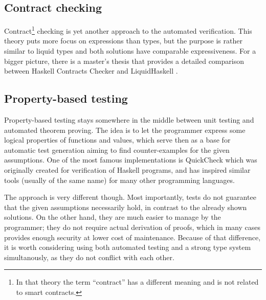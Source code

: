 \subsection{Contract checking}

Contract\footnote{In that theory the term ``contract'' has a different meaning
  and is not related to smart contracts.} checking \cite{Bruce_contractsfor} is
yet another approach to the automated verification. This theory puts more focus
on expressions than types, but the purpose is rather similar to liquid types and
both solutions have comparable expressiveness. For a bigger picture, there is a
master's thesis \cite{wojciechbaranowski2014} that provides a detailed
comparison between Haskell Contracts Checker \cite{10.1145/2480359.2429121} and
LiquidHaskell \cite{vazou2014refinement}.

\subsection{Property-based testing}

Property-based testing stays somewhere in the middle between unit testing and
automated theorem proving. The idea is to let the programmer express some
logical properties of functions and values, which serve then as a base for
automatic test generation aiming to find counter-examples for the given
assumptions. One of the most famous implementations is QuickCheck
\cite{10.1145/357766.351266} which was originally created for verification of
Haskell programs, and has inspired similar tools (usually of the same name) for
many other programming languages.

The approach is very different though. Most importantly, tests do not guarantee
that the given assumptions necessarily hold, in contrast to the already shown
solutions. On the other hand, they are much easier to manage by the programmer;
they do not require actual derivation of proofs, which in many cases provides
enough security at lower cost of maintenance. Because of that difference, it is
worth considering using both automated testing and a strong type system
simultanously, as they do not conflict with each other.
